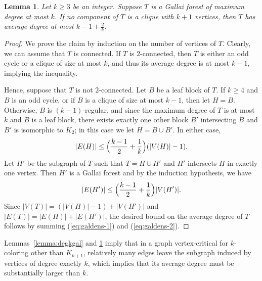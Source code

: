 \documentclass[12pt,twoside,openright,a4paper]{book}
\newtheorem{lemma}[theorem]{Lemma}
\begin{document}
\begin{lemma}\label{lemma:galdens}
Let $k\ge 3$ be an integer.  Suppose $T$ is a Gallai forest of maximum degree at most $k$.
If no component of $T$ is a clique with $k+1$ vertices, then $T$ has average degree at most
$k-1+\tfrac{2}{k}$.
\end{lemma}
\begin{proof}
We prove the claim by induction on the number of vertices of $T$.  Clearly, we can assume that $T$ is connected.
If $T$ is $2$-connected, then $T$ is either an odd cycle or a clique of size at most $k$, and thus its average
degree is at most $k-1$, implying the inequality.

Hence, suppose that $T$ is not $2$-connected.  Let $B$ be a leaf block of $T$.  If $k\ge 4$ and $B$ is an odd cycle,
or if $B$ is a clique of size at most $k-1$, then let $H=B$.  Otherwise, $B$ is $(k-1)$-regular, and since the maximum degree of $T$ is at most $k$
and $B$ is a leaf block, there exists exactly one other block $B'$ intersecting $B$ and $B'$ is isomorphic to $K_2$; in this case we let $H=B\cup B'$.
In either case,
\begin{equation}\label{eq:galdens-1}
|E(H)|\le \Bigl(\frac{k-1}{2}+\frac{1}{k}\Bigr)(|V(H)|-1).
\end{equation}
Let $H'$ be the subgraph of $T$ such that
$T=H\cup H'$ and $H'$ intersects $H$ in exactly one vertex.  Then $H'$ is a Gallai forest and by the induction hypothesis, we have
\begin{equation}\label{eq:galdens-2}
|E(H')|\le \Bigl(\frac{k-1}{2}+\frac{1}{k}\Bigr)|V(H')|.
\end{equation}
Since $|V(T)|=(|V(H)|-1)+|V(H')|$ and $|E(T)|=|E(H)|+|E(H')|$, the desired bound on the average degree of $T$ 
follows by summing (\ref{eq:galdens-1}) and (\ref{eq:galdens-2}).
\end{proof}

Lemmas~\ref{lemma:degkgal} and \ref{lemma:galdens} imply that in a graph vertex-critical for $k$-coloring other than $K_{k+1}$,
relatively many edges leave the subgraph induced by vertices of degree exactly $k$, which implies that its average degree
must be substantially larger than $k$.
\end{document}
